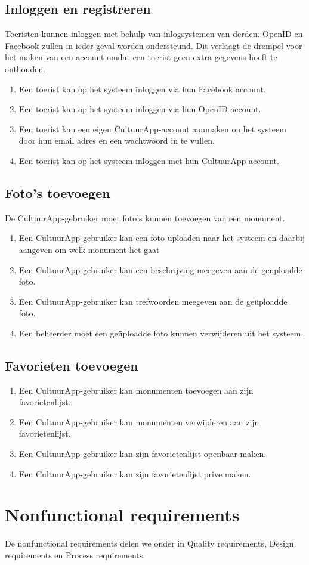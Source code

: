\documentclass[a4paper,10pt]{article}
\newcommand{\rsection}[1]{
\section{#1}\label{sec:#1}
}
\newcommand{\rsubsection}[1]{
\subsection{#1}\label{sec:sub:#1}
}
\begin{document}
\rsubsection{Inloggen en registreren}
Toeristen kunnen inloggen met behulp van inlogsystemen van derden. OpenID en Facebook zullen in ieder geval worden ondersteund. Dit verlaagt de drempel voor het maken van een account omdat een toerist geen extra gegevens hoeft te onthouden.
\begin{enumerate}
\item Een toerist kan op het systeem inloggen via hun Facebook account.
\item Een toerist kan op het systeem inloggen via hun OpenID account.
\item Een toerist kan een eigen CultuurApp-account aanmaken op het systeem door hun email adres en een wachtwoord in te vullen.
\item Een toerist kan op het systeem inloggen met hun CultuurApp-account. 
\end{enumerate}

\rsubsection{Foto's toevoegen}
De CultuurApp-gebruiker moet foto's kunnen toevoegen van een monument.
\begin{enumerate}
	\item Een CultuurApp-gebruiker kan een foto uploaden naar het systeem en daarbij aangeven om welk monument het gaat
	\item Een CultuurApp-gebruiker kan een beschrijving meegeven aan de geuploadde foto.
	\item Een CultuurApp-gebruiker kan trefwoorden meegeven aan de ge\"uploadde foto.
	\item Een beheerder moet een ge\"uploadde foto kunnen verwijderen uit het systeem.
\end{enumerate}

\rsubsection{Favorieten toevoegen}
\begin{enumerate}
	\item Een CultuurApp-gebruiker kan monumenten toevoegen aan zijn favorietenlijst.
	\item Een CultuurApp-gebruiker kan monumenten verwijderen aan zijn favorietenlijst.
	\item Een CultuurApp-gebruiker kan zijn favorietenlijst openbaar maken.
	\item Een CultuurApp-gebruiker kan zijn favorietenlijst prive maken.
\end{enumerate}
		
\clearpage
\rsection{Nonfunctional requirements}
De nonfunctional requirements delen we onder in Quality requirements, Design requirements en Process requirements.
\end{document}
